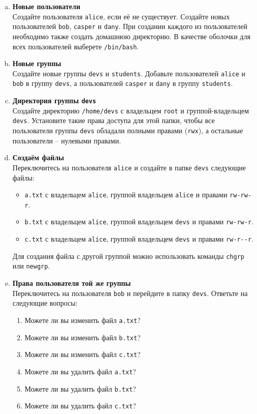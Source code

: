 \documentclass{article}
\begin{document}
\begin{enumerate}[a.]
\item \textbf{Новые пользователи}\\
Создайте пользователя \texttt{alice}, если её не существует. Создайте новых пользователей \texttt{bob}, \texttt{casper} и \texttt{dany}. При создании каждого из пользователей необходимо также создать домашнюю директорию. В качестве оболочки для всех пользователей выберете \texttt{/bin/bash}.

\item \textbf{Новые группы}\\
Создайте новые группы \texttt{devs} и \texttt{students}. Добавьте пользователей \texttt{alice} и \texttt{bob} в группу \texttt{devs}, а пользователей \texttt{casper} и \texttt{dany} в группу \texttt{students}.


\item \textbf{Директория группы \texttt{devs}}\\
Создайте директорию \texttt{/home/devs} с владельцем \texttt{root} и группой-владельцем \texttt{devs}. Установите такие права доступа для этой папки, чтобы все пользователи группы \texttt{devs} обладали полными правами (\texttt{rwx}), а остальные пользователи -- нулевыми правами. 

\item \textbf{Создаём файлы}\\
Переключитесь на пользователя \texttt{alice} и создайте в папке \texttt{devs} следующие файлы:
\begin{itemize}
\item \texttt{a.txt} с владельцем \texttt{alice}, группой владельцем \texttt{alice} и правами \texttt{rw-rw-r}.
\item \texttt{b.txt} с владельцем \texttt{alice}, группой владельцем \texttt{devs} и правами \texttt{rw-rw-r}.
\item \texttt{c.txt} с владельцем \texttt{alice}, группой владельцем \texttt{devs} и правами \texttt{rw-r-{}-r}.
\end{itemize}
Для создания файла с другой группой можно использовать команды \texttt{chgrp} или \texttt{newgrp}.

\item \textbf{Права пользователя той же группы}\\
Переключитесь на пользователя \texttt{bob} и перейдите в папку \texttt{devs}. Ответьте на следующие вопросы:
\begin{enumerate}
\item Можете ли вы изменить файл \texttt{a.txt}?
\item Можете ли вы изменить файл \texttt{b.txt}?
\item Можете ли вы изменить файл \texttt{c.txt}?
\item Можете ли вы удалить файл \texttt{a.txt}?
\item Можете ли вы удалить файл \texttt{b.txt}?
\item Можете ли вы удалить файл \texttt{c.txt}?
\end{enumerate}



\end{enumerate}
\end{document}

